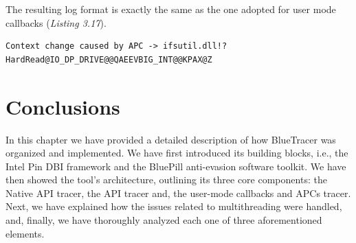 The resulting log format is exactly the same as the one adopted for user mode callbacks (\textit{Listing 3.17}).
\\
\begin{lstlisting}[caption={Log entry relative to a user mode APC},captionpos=b]
Context change caused by APC -> ifsutil.dll!?HardRead@IO_DP_DRIVE@@QAEEVBIG_INT@@KPAX@Z
\end{lstlisting}

\section{Conclusions}

In this chapter we have provided a detailed description of how BlueTracer was organized and implemented. We have first introduced its building blocks, i.e., the Intel Pin DBI framework and the BluePill  anti-evasion software toolkit. We have then showed the tool's architecture, outlining its three core components: the Native API tracer, the API tracer and, the user-mode callbacks and APCs tracer. Next, we have explained how the issues related to multithreading were handled, and, finally, we have thoroughly analyzed each one of three aforementioned elements. 